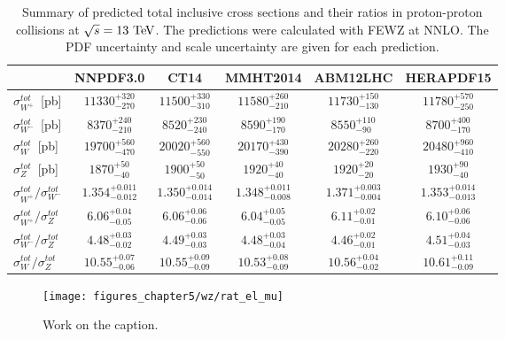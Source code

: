 \begin{table*}[tbhp]
\centering
\begin {tabular} {lccccc}
\hline
 & \multicolumn{1}{c}{NNPDF3.0} & \multicolumn{1}{c}{CT14} & \multicolumn{1}{c}{MMHT2014} & \multicolumn{1}{c}{ABM12LHC} & \multicolumn{1}{c}{HERAPDF15} \\  \hline
$\sigma^{tot}_{W^+}$~[pb] & $11330^{+320}_{-270}$ & $11500^{+330}_{-310}$ & $11580^{+260}_{-210}$ & $11730^{+150}_{-130}$ & $11780^{+570}_{-250}$\\ 
$\sigma^{tot}_{W^-}$~[pb]  & $8370^{+240}_{-210}$ & $8520^{+230}_{-240}$ & $8590^{+190}_{-170}$ & $8550^{+110}_{-90}$ & $8700^{+400}_{-170}$\\ 
$\sigma^{tot}_{W}$~[pb]  & $19700^{+560}_{-470}$ & $20020^{+560}_{-550}$ & $20170^{+430}_{-390}$ & $20280^{+260}_{-220}$ & $20480^{+960}_{-410}$ \\ 
$\sigma^{tot}_{Z}$~[pb]  & $1870^{+50}_{-40}$ & $1900^{+50}_{-50}$ & $1920^{+40}_{-40}$ & $1920^{+20}_{-20}$ & $1930^{+90}_{-40}$ \\ 
$\sigma^{tot}_{W^+}/\sigma^{tot}_{W^-}$ & $1.354^{+0.011}_{-0.012}$ &
$1.350^{+0.014}_{-0.014}$ & $1.348^{+0.011}_{-0.008}$ &
$1.371^{+0.003}_{-0.004}$ & $1.353^{+0.014}_{-0.013}$\\
$\sigma^{tot}_{W^+}/\sigma^{tot}_{Z}$ & $6.06^{+0.04}_{-0.05}$ & $6.06^{+0.06}_{-0.06}$ & $6.04^{+0.05}_{-0.05}$ & $6.11^{+0.02}_{-0.01}$ & $6.10^{+0.06}_{-0.06}$ \\ 
$\sigma^{tot}_{W^-}/\sigma^{tot}_{Z}$ & $4.48^{+0.03}_{-0.02}$ & $4.49^{+0.03}_{-0.03}$ & $4.48^{+0.03}_{-0.04}$ & $4.46^{+0.02}_{-0.01}$ & $4.51^{+0.04}_{-0.03}$ \\ 
$\sigma^{tot}_{W}/\sigma^{tot}_{Z}$ & $10.55^{+0.07}_{-0.06}$ & $10.55^{+0.09}_{-0.09}$ & $10.53^{+0.08}_{-0.09}$ & $10.56^{+0.04}_{-0.02}$ & $10.61^{+0.11}_{-0.09}$ \\ 
\hline
\end{tabular}
\caption{ \label{tab:pdfXsec}
Summary of predicted total inclusive cross sections and their ratios in proton-proton collisions at $\sqrt{s}=13~\mathrm{Te\kern -0.1em V}$. The predictions were calculated with FEWZ at NNLO. The PDF uncertainty and scale uncertainty are given for each prediction.}
\end{table*}


\begin{figure}[h]
\centering
\texttt{[image: figures\_chapter5/wz/rat\_el\_mu]}
\caption{Work on the caption.}
\label{fig:lepton_univ}
\end{figure}


